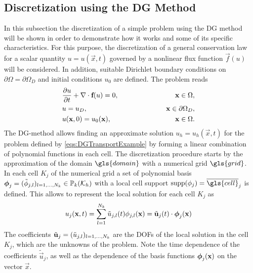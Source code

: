 \subsection{Discretization using the DG Method} \label{sec:DiscWithDG}
In this subsection the discretization of a simple problem using the DG method will be shown in order to demonstrate how it works and some of its specific characteristics. For this purpose, the discretization of a general conservation law for a scalar quantity $u = u(\vec{x},t)$ governed by a nonlinear flux function $\vec{f}(u)$ will be considered. In addition, suitable Dirichlet boundary conditions on $\partial \Omega = \partial \Omega_D$ and initial conditions $u_0$ are defined. The problem reads
\begin{subequations}
\begin{align}
&\frac{\partial u}{\partial t} + \nabla \cdot \textbf{f}(u) = 0, \qquad\qquad\qquad &\textbf{x} \in \Omega,\label{eq:consEqDG}\\
&u = u_D, \qquad \qquad \qquad  &\textbf{x} \in \partial \Omega_D,\\
&u(\textbf{x},0) = u_0(\textbf{x}), \qquad\qquad\qquad &\textbf{x}\in\Omega.
\end{align}\label{eqs:DGTransportExample}
\end{subequations}
The DG-method allows finding an approximate solution $u_h = u_h(\vec{x},t)$ for the problem defined by \cref{eqs:DGTransportExample} by forming a linear combination of polynomial functions in each cell.  The discretization procedure starts by the approximation of the domain $\gls{domain}$ with a numerical grid $\gls{grid}$. In each cell $K_j$ of the numerical grid a set of polynomial basis $\boldsymbol{\mathbf{\phi}}_j = (\tilde{\phi}_{j,l})_{l=1,\dots,N_k} \in \mathbb{P}_k(\mathcal{K}_h)$ with a local cell support $\text{supp}(\phi_j) = \overline{\gls{cell}}_j$ is defined. This allows to represent the local solution for each cell $K_j$ as
\begin{equation}
u_j(\textbf{x},t) = \sum_{l=1}^{N_k}\tilde{u}_{j,l}(t)\phi_{j,l}(\textbf{x}) = \tilde{\textbf{u}}_j(t) \cdot \boldsymbol{\mathbf{\phi}}_j (\textbf{x})\label{eq:DGAnsatz}
\end{equation}
The coefficients $\tilde{\boldsymbol{\mathbf{u}}}_j = (\tilde{u}_{j,l})_{l=1,\dots,N_k}$ are the \gls{DOFs} of the local solution in the cell $K_j$, which are the unknowns of the problem. Note the time dependence of the coefficients $\tilde{\vec{u}}_j$, as well as the dependence of the basis functions $\boldsymbol{\mathbf{\phi}}_j (\textbf{x})$ on the vector $\vec{x}$. 

